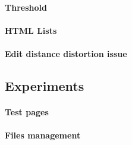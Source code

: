 \documentclass[10pt]{article}
\begin{document}
\paragraph{Threshold}

\paragraph{HTML Lists}

\paragraph{Edit distance distortion issue}




\subsection{Experiments}

\paragraph{Test pages}







\paragraph{Files management}
\end{document}
